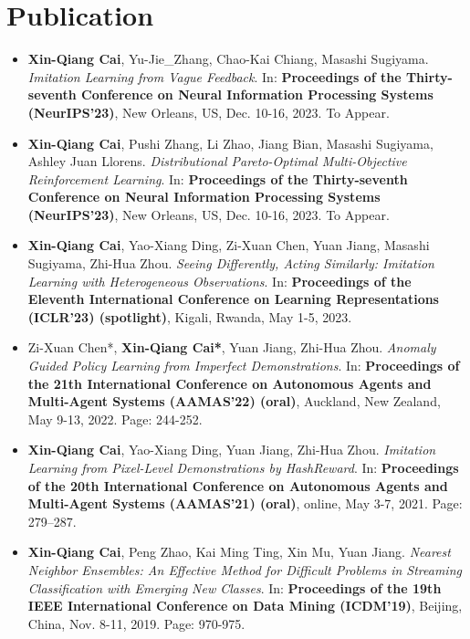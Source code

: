 \documentclass[UTF8]{ctexart}
\begin{document}
\section*{Publication}
\begin{itemize}
    \item \textbf{Xin-Qiang Cai}, Yu-Jie\_Zhang, Chao-Kai Chiang, Masashi Sugiyama. \textit{Imitation Learning from Vague Feedback}. In: \textbf{Proceedings of the Thirty-seventh Conference on Neural Information Processing Systems (NeurIPS'23)}, New Orleans, US, Dec. 10-16, 2023. To Appear.
    \item \textbf{Xin-Qiang Cai}, Pushi Zhang, Li Zhao, Jiang Bian, Masashi Sugiyama, Ashley Juan Llorens. \textit{Distributional Pareto-Optimal Multi-Objective Reinforcement Learning}. In: \textbf{Proceedings of the Thirty-seventh Conference on Neural Information Processing Systems (NeurIPS'23)}, New Orleans, US, Dec. 10-16, 2023. To Appear.
    \item \textbf{Xin-Qiang Cai}, Yao-Xiang Ding, Zi-Xuan Chen, Yuan Jiang, Masashi Sugiyama, Zhi-Hua Zhou. \textit{Seeing Differently, Acting Similarly: Imitation Learning with Heterogeneous Observations}. In: \textbf{Proceedings of the Eleventh International Conference on Learning Representations (ICLR'23) (spotlight)}, Kigali, Rwanda, May 1-5, 2023.
    \item Zi-Xuan Chen*, \textbf{Xin-Qiang Cai*}, Yuan Jiang, Zhi-Hua Zhou. \textit{Anomaly Guided Policy Learning from Imperfect Demonstrations}. In: \textbf{Proceedings of the 21th International Conference on Autonomous Agents and Multi-Agent Systems (AAMAS'22) (oral)}, Auckland, New Zealand, May 9-13, 2022. Page: 244-252.
    \item \textbf{Xin-Qiang Cai}, Yao-Xiang Ding, Yuan Jiang, Zhi-Hua Zhou. \textit{Imitation Learning from Pixel-Level Demonstrations by HashReward}. In: \textbf{Proceedings of the 20th International Conference on Autonomous Agents and Multi-Agent Systems (AAMAS'21) (oral)}, online, May 3-7, 2021. Page: 279–287.
    \item \textbf{Xin-Qiang Cai}, Peng Zhao, Kai Ming Ting, Xin Mu, Yuan Jiang. \textit{Nearest Neighbor Ensembles: An Effective Method for Difficult Problems in Streaming Classification with Emerging New Classes}. In: \textbf{Proceedings of the 19th IEEE International Conference on Data Mining (ICDM'19)}, Beijing, China, Nov. 8-11, 2019. Page: 970-975.
\end{itemize}
\end{document}
